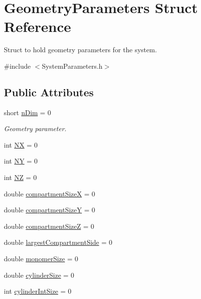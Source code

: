 \hypertarget{structGeometryParameters}{\section{Geometry\+Parameters Struct Reference}
\label{structGeometryParameters}
}


Struct to hold geometry parameters for the system.  




{\ttfamily \#include $<$System\+Parameters.\+h$>$}

\subsection*{Public Attributes}
{\bf }\par
\begin{DoxyCompactItemize}
\item 
short \hyperlink{structGeometryParameters_aa50b4a0940d8ca9da6f647a1c21d9522}{n\+Dim} = 0
\begin{DoxyCompactList}\small\item\em Geometry parameter. \end{DoxyCompactList}\item 
int \hyperlink{structGeometryParameters_a45f424cfb62b868a4becc8b0bd0d32bc}{N\+X} = 0
\item 
int \hyperlink{structGeometryParameters_a5c7a33268cbfa1b236fa1bf0ef9bafc7}{N\+Y} = 0
\item 
int \hyperlink{structGeometryParameters_a01890a89021cabfc92ee2b8e23faef60}{N\+Z} = 0
\item 
double \hyperlink{structGeometryParameters_a74845fb942433ad543c1cb7ff437da2f}{compartment\+Size\+X} = 0
\item 
double \hyperlink{structGeometryParameters_a6364473fe0575150e254838e4c91e610}{compartment\+Size\+Y} = 0
\item 
double \hyperlink{structGeometryParameters_a6c0c575c958ad3c0625f63ae3302575c}{compartment\+Size\+Z} = 0
\item 
double \hyperlink{structGeometryParameters_a0b14f97d476bd4d40bf32a75715814b0}{largest\+Compartment\+Side} = 0
\item 
double \hyperlink{structGeometryParameters_a7afc14cf30bc80757522bcabe8fb3bc9}{monomer\+Size} = 0
\item 
double \hyperlink{structGeometryParameters_ab269206056f9e28193129ca5d31d8b30}{cylinder\+Size} = 0
\item 
int \hyperlink{structGeometryParameters_a4ea73a722482f66eeaedfb57435f35d1}{cylinder\+Int\+Size} = 0
\end{DoxyCompactItemize}



